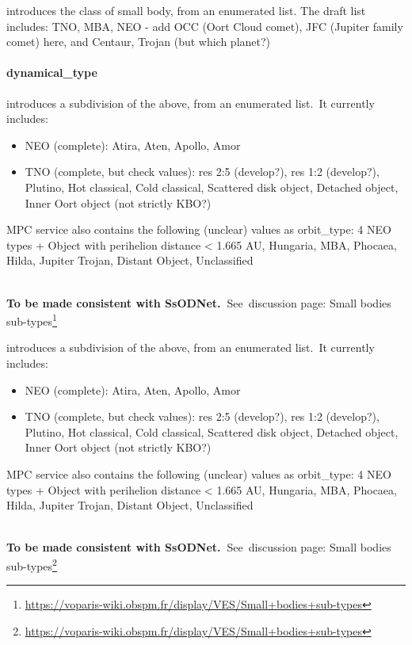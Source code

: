 \documentclass[11pt,a4paper]{ivoa}
\begin{document}
introduces the class of small body, from an enumerated list. The draft list includes: TNO, MBA, NEO - add OCC (Oort Cloud comet), JFC (Jupiter family comet) here, and Centaur, Trojan (but which planet?)

\paragraph{dynamical\_type}

introduces a subdivision of the above, from an enumerated list. It currently includes:

\begin{itemize}
\item NEO (complete): Atira, Aten, Apollo, Amor
\item TNO (complete, but check values): res 2:5 (develop?), res 1:2 (develop?), Plutino, Hot classical, Cold classical, Scattered disk object, Detached object, Inner Oort object (not strictly KBO?)
\end{itemize}

MPC service also contains the following (unclear) values as orbit\_type: 4 NEO types + Object with perihelion distance < 1.665 AU, Hungaria, MBA, Phocaea, Hilda, Jupiter Trojan, Distant Object, Unclassified

\\

\textbf{To be made consistent with SsODNet. }See discussion page: Small bodies sub-types\footnote{\url{https://voparis-wiki.obspm.fr/display/VES/Small+bodies+sub-types}}

introduces a subdivision of the above, from an enumerated list. It currently includes:

\begin{itemize}
\item NEO (complete): Atira, Aten, Apollo, Amor
\item TNO (complete, but check values): res 2:5 (develop?), res 1:2 (develop?), Plutino, Hot classical, Cold classical, Scattered disk object, Detached object, Inner Oort object (not strictly KBO?)
\end{itemize}

MPC service also contains the following (unclear) values as orbit\_type: 4 NEO types + Object with perihelion distance < 1.665 AU, Hungaria, MBA, Phocaea, Hilda, Jupiter Trojan, Distant Object, Unclassified

\\

\textbf{To be made consistent with SsODNet. }See discussion page: Small bodies sub-types\footnote{\url{https://voparis-wiki.obspm.fr/display/VES/Small+bodies+sub-types}}
\end{document}
